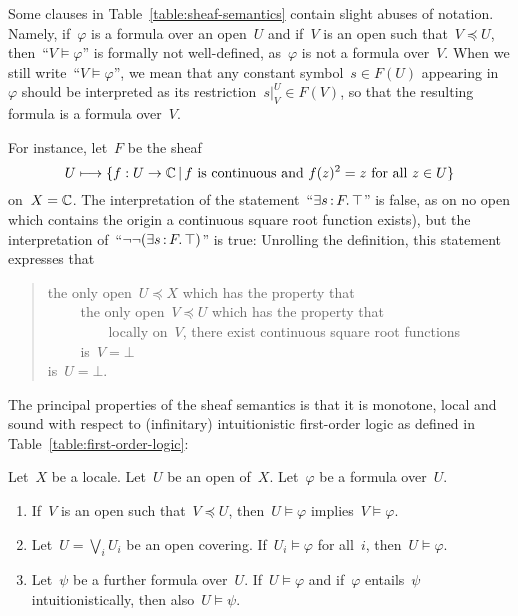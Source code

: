 \documentclass{ws-rv9x6}
\begin{document}
{Some clauses in Table~\ref{table:sheaf-semantics} contain slight abuses of
notation. Namely, if~$\varphi$ is a formula over an open~$U$ and if~$V$ is an
open such that~$V \preceq U$, then~``$V \models \varphi$'' is formally not
well-defined, as~$\varphi$ is not a formula over~$V$. When we still write~``$V
\models \varphi$'', we mean that any constant symbol~$s \in F(U)$ appearing
in~$\varphi$ should be interpreted as its restriction~$s|^U_V \in F(V)$, so
that the resulting formula is a formula over~$V$.

\begin{example}\label{ex:negneg}
For instance, let~$F$ be the sheaf
\[ U \longmapsto \{ f : U \to \mathbb{C} \,|\, \text{$f$ is continuous and~$f(z)^2 =
z$ for all~$z \in U$} \} \]
on~$X = \mathbb{C}$. The interpretation of the statement~``$\exists s\,{:}\,F\mathpunct{.} \top$'' is
false, as on no open which contains the origin a continuous square root
function exists), but the interpretation of~``$\neg\neg(\exists s\,{:}\,F\mathpunct{.} \top)$''
is true: Unrolling the definition, this statement expresses that\par
\begin{quote}
the only open~$U \preceq X$ which has the property that \\
${\qquad}$ the only open~$V \preceq U$ which has the property that \\
${\qquad\qquad}$ locally on~$V$, there exist continuous square root functions \\
${\qquad}$ is~$V = \bot$ \\
is~$U = \bot$.
\end{quote}
\end{example}


The principal properties of the sheaf semantics is that it is monotone, local
and sound with respect to (infinitary) intuitionistic first-order logic as
defined in Table~\ref{table:first-order-logic}:

\begin{theorem}\label{thm:basic-properties-sheaf-semantics}
Let~$X$ be a locale. Let~$U$ be an open of~$X$. Let~$\varphi$ be
a formula over~$U$.
\begin{enumerate}
\item If~$V$ is an open such that~$V \preceq U$, then~$U \models
\varphi$ implies~$V \models \varphi$.
\item Let~$U = \bigvee_i U_i$ be an open covering. If~$U_i \models
\varphi$ for all~$i$, then~$U \models \varphi$.
\item Let~$\psi$ be a further formula over~$U$. If~$U \models
\varphi$ and if~$\varphi$ entails~$\psi$ intuitionistically, then also~$U
\models \psi$.
\end{enumerate}
\end{theorem}

}
\end{document}
